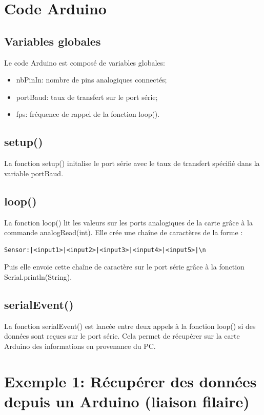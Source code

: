 \documentclass{article}
\begin{document}
\section{Code Arduino}
	\subsection{Variables globales}
Le code Arduino est composé de variables globales:
\begin{itemize}
	\item \textunderscore nbPinIn: nombre de pins analogiques connectés;
	\item \textunderscore portBaud: taux de transfert sur le port série;
	\item \textunderscore fps: fréquence de rappel de la fonction loop().
\end{itemize}

	\subsection{setup()}
La fonction setup() initalise le port série avec le taux de transfert spécifié dans la variable \textunderscore portBaud.

	\subsection{loop()}
La fonction loop() lit les valeurs sur les ports analogiques de la carte grâce à la commande analogRead(int). 
Elle crée une chaîne de caractères de la forme :  \begin{verbatim}Sensor:|<input1>|<input2>|<input3>|<input4>|<input5>|\n \end{verbatim}
Puis elle envoie cette chaîne de caractère sur le port série grâce à la fonction Serial.println(String).

	\subsection{serialEvent()}
La fonction serialEvent() est lancée entre deux appels à la fonction loop() si des données sont reçues sur le port série. 
Cela permet de récupérer sur la carte Arduino des informations en provenance du PC.


\section{Exemple 1: Récupérer des données depuis un Arduino (liaison filaire)}
\end{document}
